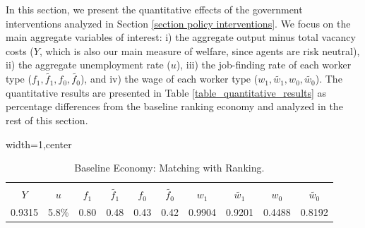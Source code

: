 \documentclass[12pt]{article} %
\theoremstyle{definition}
\begin{document}
In this section, we present the quantitative effects of the government interventions analyzed in Section \ref{section policy interventions}.
We focus on the main aggregate variables of interest: i) the aggregate output minus total vacancy costs ($Y$, which is also our main measure of welfare, since agents are risk neutral), ii) the aggregate unemployment rate ($u$), iii) the job-finding rate of each worker type ($f_{1}, \tilde{f_{1}}, f_{0}, \tilde{f_{0}}$), and iv) the wage of each worker type ($w_{1}, \tilde{w_{1}}, w_{0}, \tilde{w_{0}}$).
The quantitative results are presented in Table \ref{table_quantitative_results} as percentage differences from the baseline ranking economy and analyzed in the rest of this section.

\begin{table}[h!]

\begin{adjustbox}{width=1\columnwidth,center}

 \begin{tabular}{||c c c c c c c c c c||} 
 \hline 
 \\[-1.1em]
 \textbf{$Y$} & \textbf{$u$} & \textbf{$f_{1}$} & \textbf{$\tilde{f_1}$} & \textbf{$f_{0}$} & \textbf{$\tilde{f_0}$} & \textbf{$w_{1}$} & \textbf{$\tilde{w_1}$} & \textbf{$w_{0}$} & \textbf{$\tilde{w_0}$}   \\  
 \hline\hline
  0.9315 & 5.8\% & 0.80 & 0.48 & 0.43 & 0.42 & 0.9904  & 0.9201  & 0.4488  &  0.8192 \\ [1ex] 
 \hline
 \end{tabular}
\end{adjustbox}
\centering
\caption{Baseline Economy: Matching with Ranking.} \label{table_baseline_economy}
\end{table} 
\end{document}

